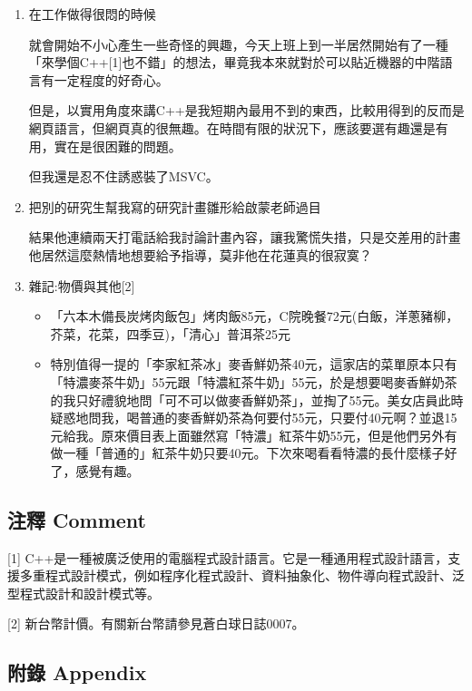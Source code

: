\documentclass[
]{article}
\providecommand{\tightlist}{%
  \setlength{\itemsep}{0pt}\setlength{\parskip}{0pt}}
\begin{document}
\begin{enumerate}
\def\labelenumi{\arabic{enumi}.}
\item
  在工作做得很悶的時候

  就會開始不小心產生一些奇怪的興趣，今天上班上到一半居然開始有了一種「來學個C++{[}1{]}也不錯」的想法，畢竟我本來就對於可以貼近機器的中階語言有一定程度的好奇心。

  但是，以實用角度來講C++是我短期內最用不到的東西，比較用得到的反而是網頁語言，但網頁真的很無趣。在時間有限的狀況下，應該要選有趣還是有用，實在是很困難的問題。

  但我還是忍不住誘惑裝了MSVC。
\item
  把別的研究生幫我寫的研究計畫雛形給啟蒙老師過目

  結果他連續兩天打電話給我討論計畫內容，讓我驚慌失措，只是交差用的計畫他居然這麼熱情地想要給予指導，莫非他在花蓮真的很寂寞？
\item
  雜記:物價與其他{[}2{]}

  \begin{itemize}
  \tightlist
  \item
    「六本木備長炭烤肉飯包」烤肉飯85元，C院晚餐72元(白飯，洋蔥豬柳，芥菜，花菜，四季豆)，「清心」普洱茶25元
  \item
    特別值得一提的「李家紅茶冰」麥香鮮奶茶40元，這家店的菜單原本只有「特濃麥茶牛奶」55元跟「特濃紅茶牛奶」55元，於是想要喝麥香鮮奶茶的我只好禮貌地問「可不可以做麥香鮮奶茶」，並掏了55元。美女店員此時疑惑地問我，喝普通的麥香鮮奶茶為何要付55元，只要付40元啊？並退15元給我。原來價目表上面雖然寫「特濃」紅茶牛奶55元，但是他們另外有做一種「普通的」紅茶牛奶只要40元。下次來喝看看特濃的長什麼樣子好了，感覺有趣。
  \end{itemize}
\end{enumerate}

\hypertarget{ux6ce8ux91cb-comment-10}{%
\subsection{注釋 Comment}\label{ux6ce8ux91cb-comment-10}}

{[}1{]}
C++是一種被廣泛使用的電腦程式設計語言。它是一種通用程式設計語言，支援多重程式設計模式，例如程序化程式設計、資料抽象化、物件導向程式設計、泛型程式設計和設計模式等。

{[}2{]} 新台幣計價。有關新台幣請參見蒼白球日誌0007。

\hypertarget{ux9644ux9304-appendix-11}{%
\subsection{附錄 Appendix}\label{ux9644ux9304-appendix-11}}
\end{document}

